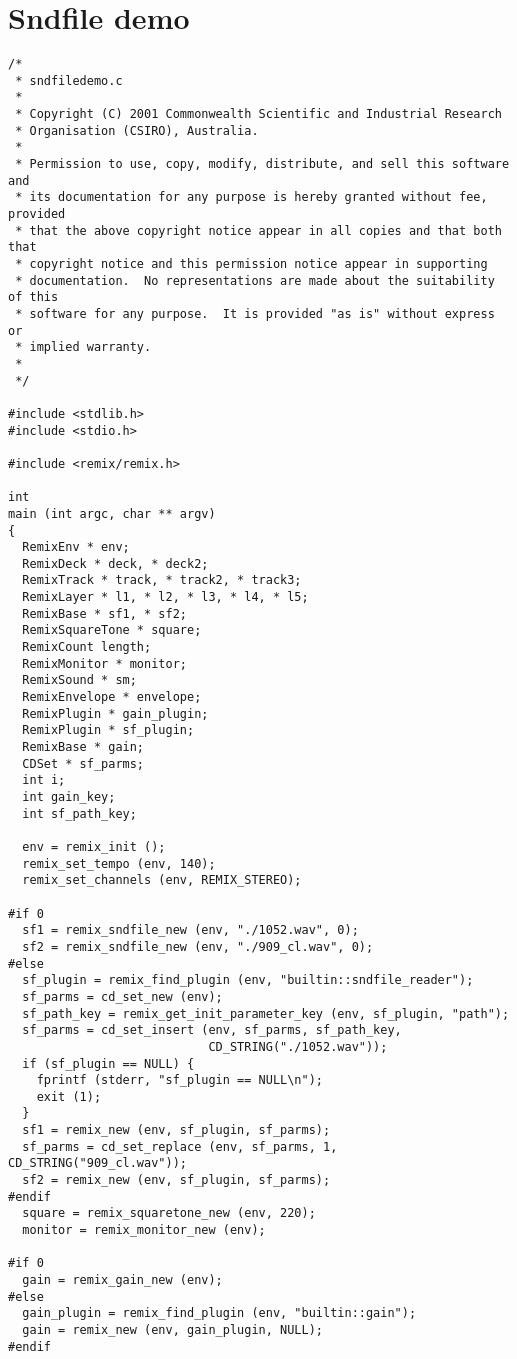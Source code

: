 \section{Sndfile demo}
\label{group__sndfiledemo}


\footnotesize\begin{verbatim}/*
 * sndfiledemo.c
 *
 * Copyright (C) 2001 Commonwealth Scientific and Industrial Research
 * Organisation (CSIRO), Australia.
 *
 * Permission to use, copy, modify, distribute, and sell this software and
 * its documentation for any purpose is hereby granted without fee, provided
 * that the above copyright notice appear in all copies and that both that
 * copyright notice and this permission notice appear in supporting
 * documentation.  No representations are made about the suitability of this
 * software for any purpose.  It is provided "as is" without express or
 * implied warranty.
 *
 */

#include <stdlib.h>
#include <stdio.h>

#include <remix/remix.h>

int
main (int argc, char ** argv)
{
  RemixEnv * env;
  RemixDeck * deck, * deck2;
  RemixTrack * track, * track2, * track3;
  RemixLayer * l1, * l2, * l3, * l4, * l5;
  RemixBase * sf1, * sf2;
  RemixSquareTone * square;
  RemixCount length;
  RemixMonitor * monitor;
  RemixSound * sm;
  RemixEnvelope * envelope;
  RemixPlugin * gain_plugin;
  RemixPlugin * sf_plugin;
  RemixBase * gain;
  CDSet * sf_parms;
  int i;
  int gain_key;
  int sf_path_key;

  env = remix_init ();
  remix_set_tempo (env, 140);
  remix_set_channels (env, REMIX_STEREO);

#if 0
  sf1 = remix_sndfile_new (env, "./1052.wav", 0);
  sf2 = remix_sndfile_new (env, "./909_cl.wav", 0);
#else
  sf_plugin = remix_find_plugin (env, "builtin::sndfile_reader");
  sf_parms = cd_set_new (env);
  sf_path_key = remix_get_init_parameter_key (env, sf_plugin, "path");
  sf_parms = cd_set_insert (env, sf_parms, sf_path_key,
                            CD_STRING("./1052.wav"));
  if (sf_plugin == NULL) {
    fprintf (stderr, "sf_plugin == NULL\n");
    exit (1);
  }
  sf1 = remix_new (env, sf_plugin, sf_parms);
  sf_parms = cd_set_replace (env, sf_parms, 1, CD_STRING("909_cl.wav"));
  sf2 = remix_new (env, sf_plugin, sf_parms);
#endif
  square = remix_squaretone_new (env, 220);
  monitor = remix_monitor_new (env);

#if 0
  gain = remix_gain_new (env);
#else
  gain_plugin = remix_find_plugin (env, "builtin::gain");
  gain = remix_new (env, gain_plugin, NULL);
#endif


\end{verbatim}
